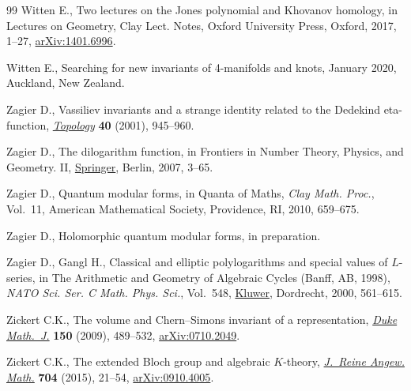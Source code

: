 \documentclass[pdftex]{sigma}
\numberwithin{equation}{section}
\begin{document}
\begin{thebibliography}{99}
Witten E., Two lectures on the {J}ones polynomial and {K}hovanov homology, in
 Lectures on {G}eometry, Clay Lect. Notes, Oxford University Press, Oxford,
 2017, 1--27, \href{https://arxiv.org/abs/1401.6996}{arXiv:1401.6996}.

Witten E., Searching for new invariants of 4-manifolds and knots, {J}anuary
 2020, Auckland, New Zealand.

Zagier D., Vassiliev invariants and a strange identity related to the
 {D}edekind eta-function, \href{https://doi.org/10.1016/S0040-9383(00)00005-7}{\textit{Topology}} \textbf{40} (2001), 945--960.

Zagier D., The dilogarithm function, in Frontiers in {N}umber {T}heory,
 {P}hysics, and {G}eometry. {II}, \href{https://doi.org/10.1007/978-3-540-30308-4_1}{Springer}, Berlin, 2007, 3--65.

Zagier D., Quantum modular forms, in Quanta of {M}aths, \textit{Clay Math.
 Proc.}, Vol.~11, American Mathematical Society, Providence, RI, 2010,
 659--675.

Zagier D., Holomorphic quantum modular forms, in preparation.

Zagier D., Gangl H., Classical and elliptic polylogarithms and special values
 of {$L$}-series, in The Arithmetic and Geometry of Algebraic Cycles ({B}anff,
 {AB}, 1998), \textit{NATO Sci. Ser. C Math. Phys. Sci.}, Vol.~548, \href{https://doi.org/10.1007/978-94-011-4098-0_21}{Kluwer},
 Dordrecht, 2000, 561--615.

Zickert C.K., The volume and {C}hern--{S}imons invariant of a representation,
 \href{https://doi.org/10.1215/00127094-2009-058}{\textit{Duke Math.~J.}} \textbf{150} (2009), 489--532, \href{https://arxiv.org/abs/0710.2049}{arXiv:0710.2049}.

Zickert C.K., The extended {B}loch group and algebraic {$K$}-theory,
 \href{https://doi.org/10.1515/crelle-2013-0055}{\textit{J.~Reine Angew. Math.}} \textbf{704} (2015), 21--54,
 \href{https://arxiv.org/abs/0910.4005}{arXiv:0910.4005}.

\end{thebibliography}\LastPageEnding
\end{document}
